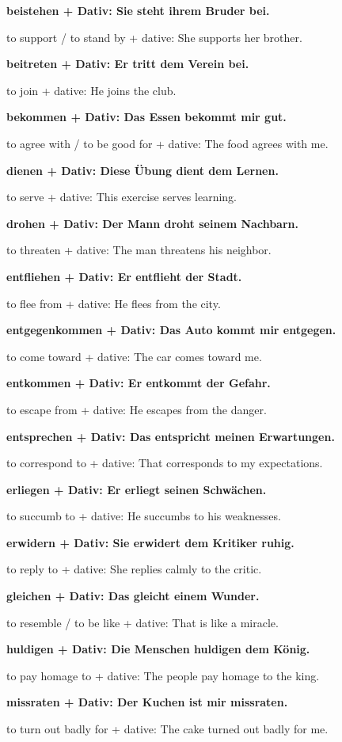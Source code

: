 \documentclass[a4paper]{article}
\newcommand{\EN}[1]{\par{\small\textcolor{TranslationGray}{#1}}\vspace{0.4em}}
\begin{document}
            \textbf{beistehen + Dativ: Sie steht ihrem Bruder bei.}
            \EN{to support / to stand by + dative: She supports her brother.}
            
            \textbf{beitreten + Dativ: Er tritt dem Verein bei.}
            \EN{to join + dative: He joins the club.}
            
            \textbf{bekommen + Dativ: Das Essen bekommt mir gut.}
            \EN{to agree with / to be good for + dative: The food agrees with me.}
            
            \textbf{dienen + Dativ: Diese Übung dient dem Lernen.}
            \EN{to serve + dative: This exercise serves learning.}
            
            \textbf{drohen + Dativ: Der Mann droht seinem Nachbarn.}
            \EN{to threaten + dative: The man threatens his neighbor.}
            
            \textbf{entfliehen + Dativ: Er entflieht der Stadt.}
            \EN{to flee from + dative: He flees from the city.}
            
            \textbf{entgegenkommen + Dativ: Das Auto kommt mir entgegen.}
            \EN{to come toward + dative: The car comes toward me.}
            
            \textbf{entkommen + Dativ: Er entkommt der Gefahr.}
            \EN{to escape from + dative: He escapes from the danger.}
            
            \textbf{entsprechen + Dativ: Das entspricht meinen Erwartungen.}
            \EN{to correspond to + dative: That corresponds to my expectations.}
            
            \textbf{erliegen + Dativ: Er erliegt seinen Schwächen.}
            \EN{to succumb to + dative: He succumbs to his weaknesses.}
            
            \textbf{erwidern + Dativ: Sie erwidert dem Kritiker ruhig.}
            \EN{to reply to + dative: She replies calmly to the critic.}
            
            \textbf{gleichen + Dativ: Das gleicht einem Wunder.}
            \EN{to resemble / to be like + dative: That is like a miracle.}
            
            \textbf{huldigen + Dativ: Die Menschen huldigen dem König.}
            \EN{to pay homage to + dative: The people pay homage to the king.}
            
            \textbf{missraten + Dativ: Der Kuchen ist mir missraten.}
            \EN{to turn out badly for + dative: The cake turned out badly for me.}
            
\end{document}
